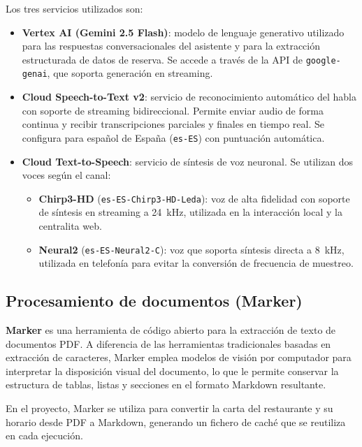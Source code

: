 Los tres servicios utilizados son:

\begin{itemize}
    \item \textbf{Vertex AI (Gemini 2.5 Flash)}: modelo de lenguaje generativo utilizado para las respuestas conversacionales del asistente y para la extracción estructurada de datos de reserva. Se accede a través de la API de \texttt{google-genai}, que soporta generación en streaming.
    
    \item \textbf{Cloud Speech-to-Text v2}: servicio de reconocimiento automático del habla con soporte de streaming bidireccional. Permite enviar audio de forma continua y recibir transcripciones parciales y finales en tiempo real. Se configura para español de España (\texttt{es-ES}) con puntuación automática.
    
    \item \textbf{Cloud Text-to-Speech}: servicio de síntesis de voz neuronal. Se utilizan dos voces según el canal:
    \begin{itemize}
        \item \textbf{Chirp3-HD} (\texttt{es-ES-Chirp3-HD-Leda}): voz de alta fidelidad con soporte de síntesis en streaming a 24~kHz, utilizada en la interacción local y la centralita web.
        \item \textbf{Neural2} (\texttt{es-ES-Neural2-C}): voz que soporta síntesis directa a 8~kHz, utilizada en telefonía para evitar la conversión de frecuencia de muestreo.
    \end{itemize}
\end{itemize}

\subsection{Procesamiento de documentos (Marker)}
\label{subsec:marker_stack}

\textbf{Marker} es una herramienta de código abierto para la extracción de texto de documentos PDF. A diferencia de las herramientas tradicionales basadas en extracción de caracteres, Marker emplea modelos de visión por computador para interpretar la disposición visual del documento, lo que le permite conservar la estructura de tablas, listas y secciones en el formato Markdown resultante.

En el proyecto, Marker se utiliza para convertir la carta del restaurante y su horario desde PDF a Markdown, generando un fichero de caché que se reutiliza en cada ejecución.

